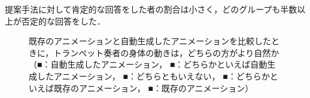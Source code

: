 提案手法に対して肯定的な回答をした者の割合は小さく，どのグループも半数以上が否定的な回答をした．
\begin{figure}[!h]
	\centering
	\hspace{5mm}
	\hspace{5mm}
	\caption{既存のアニメーションと自動生成したアニメーションを比較したときに，トランペット奏者の身体の動きは，どちらの方がより自然か\\
		（{\color{legend1}■}：自動生成したアニメーション，
		{\color{legend2}■}：どちらかといえば自動生成したアニメーション，
		{\color{legend3}■}：どちらともいえない，
		{\color{legend4}■}：どちらかといえば既存のアニメーション，
		{\color{legend5}■}：既存のアニメーション）}
	\label{fig:Q2-2}
\end{figure}
\vspace{5mm}
